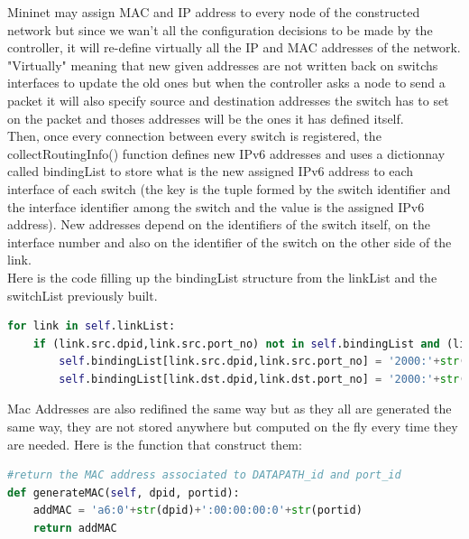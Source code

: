 \documentclass{article}
\begin{document}
Mininet may assign MAC and IP address to every node of the constructed
network but since we wan't all the configuration decisions to be made
by the controller, it will re-define virtually all the IP and MAC
addresses of the network. "Virtually" meaning that new given addresses
are not written back on switchs interfaces to update the old ones but
when the controller asks a node to send a packet it will also specify
source and destination addresses the switch has to set on the packet
and thoses addresses will be the ones it has defined itself.\\
\newline
Then, once every connection between every switch is registered, the
collectRoutingInfo() function defines new IPv6 addresses and uses a
dictionnay called bindingList to store what is the new assigned IPv6
address to each interface of each switch (the key is the tuple formed
by the switch identifier and the interface identifier among the switch
and the value is the assigned IPv6 address). New addresses depend on
the identifiers of the switch itself, on the interface number and also
on the identifier of the switch on the other side of the link.\\
\newline
Here is the code filling up the bindingList structure from the linkList
and the switchList previously built.

\begin{lstlisting}[frame=single,language=Python,breaklines=true] 
for link in self.linkList:
    if (link.src.dpid,link.src.port_no) not in self.bindingList and (link.dst.dpid,link.dst.port_no) not in self.bindingList :
        self.bindingList[link.src.dpid,link.src.port_no] = '2000:'+str(link.src.dpid)+str(link.dst.dpid)+'::'+str(link.src.dpid)
        self.bindingList[link.dst.dpid,link.dst.port_no] = '2000:'+str(link.src.dpid)+str(link.dst.dpid)+'::'+str(link.dst.dpid)
\end{lstlisting}

Mac Addresses are also redifined the same way but as they all are
generated the same way, they are not stored anywhere but computed on
the fly every time they are needed. Here is the function that
construct them:

\begin{lstlisting}[frame=single,language=Python,breaklines=true] 
#return the MAC address associated to DATAPATH_id and port_id
def generateMAC(self, dpid, portid):
    addMAC = 'a6:0'+str(dpid)+':00:00:00:0'+str(portid)
    return addMAC
\end{lstlisting}
\end{document}
